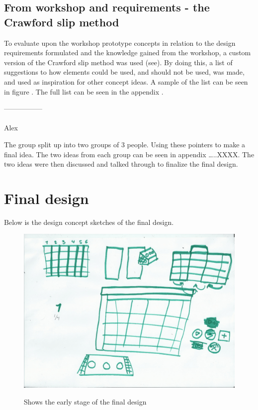 \subsection{From workshop and requirements - the Crawford slip method}
To evaluate upon the workshop prototype concepts in relation to the design requirements formulated and the knowledge gained from the workshop, a custom version of the Crawford slip method was used (see). By doing this, a list of suggestions to how elements could be used, and should not be used, was made, and used as inspiration for other concept ideas. A sample of the list can be seen in figure . The full list can be seen in the appendix .  

-----------------\\\\







Alex



The group split up into two groups of 3 people. Using these pointers to make a final idea. 
The two ideas from each group can be seen in appendix …..XXXX. 
The two ideas were then discussed and talked through to finalize the final design. 

\section{Final design}
Below is the design concept sketches of the final design. 

\begin{figure}[H]
	\centering
	\includegraphics[width=0.7\linewidth]{figure/Design/sketchOne}
	\label{fig:sketchOne}
	\caption{Shows the early stage of the final design}
	
\end{figure}

